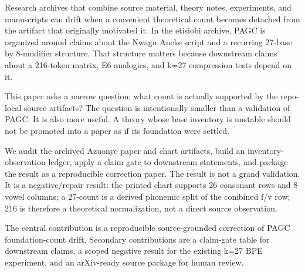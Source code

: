 Research archives that combine source material, theory notes, experiments, and manuscripts can drift when a convenient theoretical count becomes detached from the artifact that originally motivated it. In the etisiobi archive, PAGC is organized around claims about the Nwagu Aneke script and a recurring 27-base by 8-modifier structure. That structure matters because downstream claims about a 216-token matrix, E6 analogies, and k=27 compression tests depend on it.

This paper asks a narrow question: what count is actually supported by the repo-local source artifacts? The question is intentionally smaller than a validation of PAGC. It is also more useful. A theory whose base inventory is unstable should not be promoted into a paper as if its foundation were settled.

We audit the archived Azuonye paper and chart artifacts, build an inventory-observation ledger, apply a claim gate to downstream statements, and package the result as a reproducible correction paper. The result is not a grand validation. It is a negative/repair result: the printed chart supports 26 consonant rows and 8 vowel columns; a 27-count is a derived phonemic split of the combined f/v row; 216 is therefore a theoretical normalization, not a direct source observation.

The central contribution is a reproducible source-grounded correction of PAGC foundation-count drift. Secondary contributions are a claim-gate table for downstream claims, a scoped negative result for the existing k=27 BPE experiment, and an arXiv-ready source package for human review.
